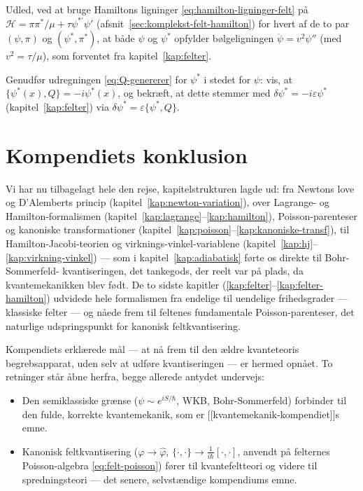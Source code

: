 \begin{opgave}
Udled, ved at bruge Hamiltons ligninger \eqref{eq:hamilton-ligninger-felt}
på $\mathcal{H}=\pi\pi^\ast/\mu+\tau\psi^{\ast\prime}\psi'$
(afsnit~\ref{sec:komplekst-felt-hamilton}) for hvert af de to par
$(\psi,\pi)$ og $(\psi^\ast,\pi^\ast)$, at både $\psi$ og $\psi^\ast$
opfylder bølgeligningen $\ddot\psi=v^2\psi''$ (med $v^2=\tau/\mu$),
som forventet fra kapitel~\ref{kap:felter}.
\end{opgave}

\begin{opgave}
Genudfør udregningen \eqref{eq:Q-genererer} for $\psi^\ast$ i stedet
for $\psi$: vis, at $\{\psi^\ast(x),Q\}=-i\psi^\ast(x)$, og bekræft,
at dette stemmer med $\delta\psi^\ast=-i\varepsilon\psi^\ast$
(kapitel~\ref{kap:felter}) via $\delta\psi^\ast=\varepsilon\{\psi^\ast,Q\}$.
\end{opgave}

\section*{Kompendiets konklusion}

Vi har nu tilbagelagt hele den rejse, kapitelstrukturen lagde ud: fra
Newtons love og D'Alemberts princip (kapitel~\ref{kap:newton-variation}),
over Lagrange- og Hamilton-formalismen
(kapitel~\ref{kap:lagrange}--\ref{kap:hamilton}), Poisson-parenteser
og kanoniske transformationer
(kapitel~\ref{kap:poisson}--\ref{kap:kanoniske-transf}), til
Hamilton-Jacobi-teorien og virknings-vinkel-variablene
(kapitel~\ref{kap:hj}--\ref{kap:virkning-vinkel}) — som i
kapitel~\ref{kap:adiabatisk} førte os direkte til Bohr-Sommerfeld-
kvantiseringen, det tankegods, der reelt var på plads, da
kvantemekanikken blev født. De to sidste kapitler
(\ref{kap:felter}--\ref{kap:felter-hamilton}) udvidede hele
formalismen fra endelige til uendelige frihedsgrader — klassiske
felter — og nåede frem til feltenes fundamentale Poisson-parenteser,
det naturlige udspringspunkt for kanonisk feltkvantisering.

Kompendiets erklærede mål — at nå frem til den ældre kvanteteoris
begrebsapparat, uden selv at udføre kvantiseringen — er hermed
opnået. To retninger står åbne herfra, begge allerede antydet
undervejs:

\begin{itemize}
  \item Den semiklassiske grænse ($\psi\sim e^{iS/\hbar}$, WKB,
        Bohr-Sommerfeld) forbinder til den fulde, korrekte
        kvantemekanik, som er [[kvantemekanik-kompendiet]]s emne.
  \item Kanonisk feltkvantisering ($\varphi\to\hat\varphi$,
        $\{\cdot,\cdot\}\to\frac{1}{i\hbar}[\cdot,\cdot]$, anvendt på
        felternes Poisson-algebra \eqref{eq:felt-poisson})
        fører til kvantefeltteori og videre til spredningsteori — det
        senere, selvstændige kompendiums emne.
\end{itemize}

